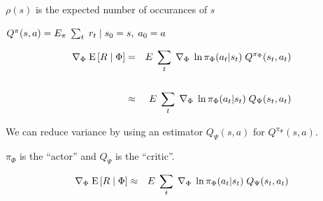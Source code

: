 {\vfill
$\rho(s)$ is the expected number of occurances of $s$

\vfill
$Q^\pi(s,a) = E_{\pi}\;\sum_t\; r_t\;|\;s_0=s,\;a_0=a$


\begin{eqnarray*}
  \nabla_\Phi \;\mathrm{E}\left[R \;|\; \Phi\right] & = & E\;\sum_t\; \nabla_\Phi\; \ln \pi_\Phi(a_t|s_t) \;Q^{\pi_\Phi}(s_t,a_t) \\
  \\
  & \approx & E\;\sum_t\; \nabla_\Phi\; \ln \pi_\Phi(a_t|s_t) \;Q_\Psi(s_t,a_t) \\
\end{eqnarray*}

\vfill
We can reduce variance by using an estimator $Q_\Psi(s,a)$ for $Q^{\pi_\Phi}(s,a)$.

\vfill
$\pi_\Phi$ is the ``actor'' and $Q_\Psi$ is the ``critic''.

\begin{eqnarray*}
  \nabla_\Phi \;\mathrm{E}\left[R \;|\; \Phi\right] & \approx & E\;\sum_t\; \nabla_\Phi\; \ln \pi_\Phi(a_t|s_t) \;Q_\Psi(s_t,a_t) \\
\end{eqnarray*}

}
